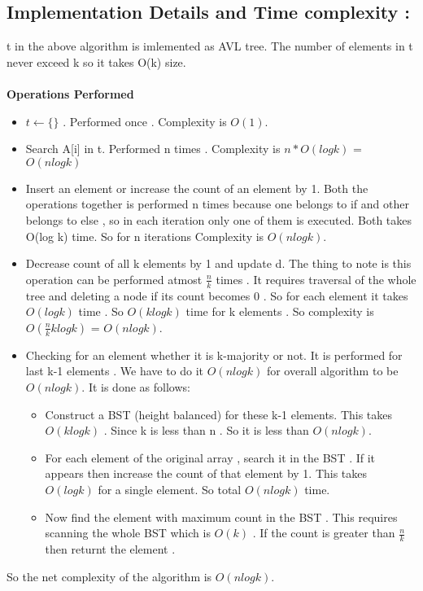 \documentclass[11pt]{article}
\begin{document}
\subsection*{ Implementation Details and Time complexity :} 
t in the above algorithm is imlemented as AVL tree. The number of elements in t never exceed k so it takes O(k) size. \\ \\
\textbf{Operations Performed}
\begin{itemize}
\item $t \leftarrow \lbrace \rbrace$ . Performed once . Complexity is $O(1)$.
\item Search A[i] in t. Performed n times . Complexity is $n*O(log k)$ = $O(nlog k)$
\item Insert an element or increase the count of an element by 1. Both the operations together is performed n times because one belongs to if and other belongs to else , so in each iteration  only one of them is executed. Both takes O(log k) time. So for n iterations Complexity is $O(nlog k)$.
\item Decrease count of all k elements by 1 and update d. The thing to note is this operation can be performed atmost $\frac{n}{k}$ times . It requires traversal of the whole tree and deleting a node if its count becomes 0 . So for each element it takes $O(log k)$ time . So $O(k log k)$ time for k elements . So complexity is $O(\frac{n}{k}klog k)$ = $O(nlog k)$. 
\item Checking for an element whether it is k-majority or not. It is performed for last k-1 elements . We have to do it  $O(n log k)$ for overall algorithm to be $O(n log k)$. It is done as follows:
\begin{itemize}
\item Construct a BST (height balanced) for these k-1 elements. This takes $O(klogk)$ . Since k is less than n . So it is less than $O(nlog k)$.
\item For each element of the original array , search it in the BST . If it appears then increase the count of that element by 1. This takes $O(logk)$ for a single element. So total $O(n log k)$ time. 
\item Now find the element with maximum count in the BST . This requires scanning the whole BST which is $O(k)$ . If the count is greater than $\frac{n}{k}$ then returnt the element . 
\end{itemize} 
\end{itemize}
So the net complexity of the algorithm is $O(nlog k)$.
\end{document}
